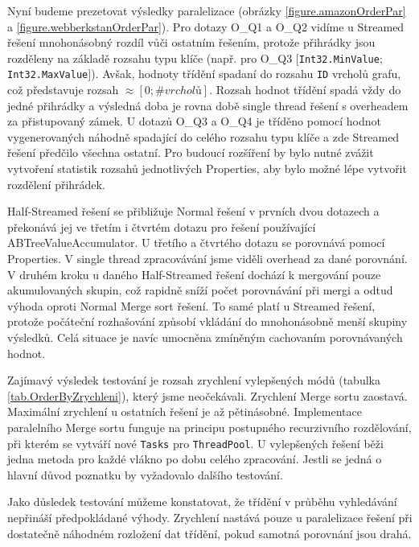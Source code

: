 Nyní budeme prezetovat výsledky paralelizace (obrázky \ref{figure.amazonOrderPar} a \ref{figure.webberkstanOrderPar}).
Pro dotazy O\_Q1 a O\_Q2 vidíme u Streamed řešení mnohonásobný rozdíl vůči ostatním řešením, protože přihrádky jsou rozděleny na základě rozsahu typu klíče (např. pro O\_Q3 $[$\verb+Int32.MinValue+; \verb+Int32.MaxValue+$]$).
Avšak, hodnoty třídění spadaní do rozsahu \verb+ID+ vrcholů grafu, což představuje rozsah $\approx [0; \#vrcholů]$. 
Rozsah hodnot třídění spadá vždy do jedné přihrádky a výsledná doba je rovna době single thread řešení s overheadem za přistupovaný zámek.
U dotazů O\_Q3 a O\_Q4 je tříděno pomocí hodnot vygenerovaných náhodně spadající do celého rozsahu typu klíče a zde Streamed řešení předčilo všechna ostatní. 
Pro budoucí rozšíření by bylo nutné zvážit vytvoření statistik rozsahů jednotlivých Properties, aby bylo možné lépe vytvořit rozdělení přihrádek.

Half-Streamed řešení se přibližuje Normal řešení v prvních dvou dotazech a překonává jej ve třetím i čtvrtém dotazu pro řešení používající ABTreeValueAccumulator.
U třetího a čtvrtého dotazu se porovnává pomocí Properties. V single thread zpracovávání jsme viděli overhead za dané porovnání.
V druhém kroku u daného Half-Streamed řešení dochází k mergování pouze akumulovaných skupin, což rapidně sníží počet porovnávání při mergi a odtud výhoda oproti Normal Merge sort řešení. 
To samé platí u Streamed řešení, protože počáteční rozhašování způsobí vkládání do mnohonásobně menší skupiny výsledků. 
Celá situace je navíc umocněna zmíněným cachovaním porovnávaných hodnot. 

Zajímavý výsledek testování je rozsah zrychlení vylepšených módů (tabulka \ref{tab.OrderByZrychleni}), který jsme neočekávali. 
Zrychlení Merge sortu zaostavá. Maximální zrychlení u ostatních řešení je až pětinásobné. 
Implementace paralelního Merge sortu funguje na principu postupného recurzivního rozdělování, při kterém se vytváří nové \verb+Tasks+ pro \verb+ThreadPool+.
U vylepšených řešení běži jedna metoda pro každé vlákno po dobu celého zpracování. Jestli se jedná o hlavní důvod poznatku by vyžadovalo dalšího testování. 

Jako důsledek testování můžeme konstatovat, že třídění v průběhu vyhledávání nepřináší předpokládané výhody.
Zrychlení nastává pouze u paralelizace řešení při dostatečně náhodném rozložení dat třídění, pokud samotná porovnání jsou drahá.

